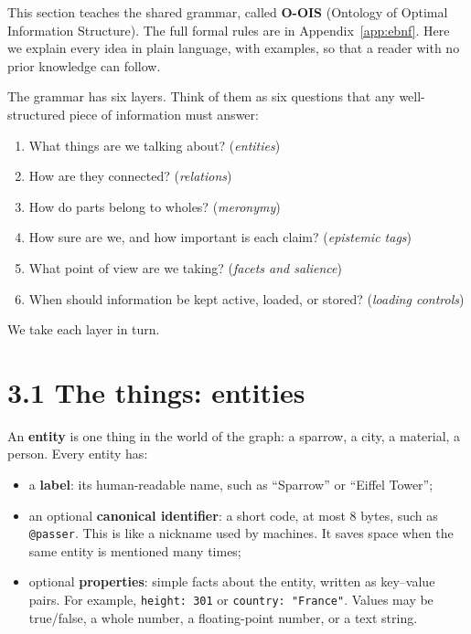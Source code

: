 \label{sec:ontology}

This section teaches the shared grammar, called \textbf{O-OIS} (Ontology of Optimal Information Structure). The full formal rules are in Appendix~\ref{app:ebnf}. Here we explain every idea in plain language, with examples, so that a reader with no prior knowledge can follow.

The grammar has six layers. Think of them as six questions that any well-structured piece of information must answer:

\begin{enumerate}
\item What things are we talking about? (\textit{entities})
\item How are they connected? (\textit{relations})
\item How do parts belong to wholes? (\textit{meronymy})
\item How sure are we, and how important is each claim? (\textit{epistemic tags})
\item What point of view are we taking? (\textit{facets and salience})
\item When should information be kept active, loaded, or stored? (\textit{loading controls})
\end{enumerate}

We take each layer in turn.

\section*{3.1 The things: entities}

An \textbf{entity} is one thing in the world of the graph: a sparrow, a city, a material, a person. Every entity has:

\begin{itemize}
\item a \textbf{label}: its human-readable name, such as ``Sparrow'' or ``Eiffel Tower'';
\item an optional \textbf{canonical identifier}: a short code, at most 8 bytes, such as \texttt{@passer}. This is like a nickname used by machines. It saves space when the same entity is mentioned many times;
\item optional \textbf{properties}: simple facts about the entity, written as key--value pairs. For example, \texttt{height: 301} or \texttt{country: "France"}. Values may be true/false, a whole number, a floating-point number, or a text string.
\end{itemize}

